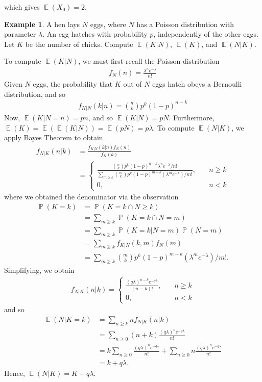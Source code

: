 \documentclass[12pt]{article}
\DeclareMathOperator{\ex}{\mathbb{E}}
\DeclareMathOperator{\prob}{\mathbb{P}}
\theoremstyle{plain}
\theoremstyle{definition}
\newtheorem*{example}{Example}
\theoremstyle{remark}
\numberwithin{equation}{section}  %
\begin{document}
which gives $\ex(X_0) = 2$.
\begin{example}
	A hen lays $N$ eggs, where $N$ has a Poisson distribution with parameter
	$\lambda$. An egg hatches with probability $p$, independently  of the other
	eggs. Let $K$ be the number of chicks. Compute $\ex(K|N)$, $\ex(K)$, and $\ex(N | 
	K)$.
\end{example}
To compute $\ex(K|N)$, we must first recall the Poisson distribution
\begin{align*}
	f_N(n) = \frac{\lambda^n e^{-\lambda}}{n!}
\end{align*}
Given $N$ eggs, the probability that $K$ out of $N$ eggs hatch obeys a 
Bernoulli distribution, and so 
\begin{align*}
	f_{K|N}(k|n) = \binom{n}{k} p^k {(1-p)}^{n-k}
\end{align*}
Now, $\ex(K | N = n) = pn$, and so $\ex(K | N) = pN$. Furthermore, $\ex(K) = \ex(\ex(K
| N	)) = \ex(pN) = p \lambda$.
To compute $\ex(N | K)$, we apply Bayes Theorem to obtain
\begin{align*}
	f_{N|K}(n|k) & = \frac{f_{K|N}(k|n)f_N(n)}{f_K(k)}
	\\
	& = \begin{cases}
	\frac{\binom{n}{k}p^k {(1-p)}^{n-k} \lambda^n
	e^{-\lambda}/n!}{\sum_{m \ge k}
	\binom{m}{k} p^k {(1 - p)}^{m-k} (\lambda^m e^{-\lambda})/m!}
	, \quad & n \ge k
	\\
	0, \quad & n<k
\end{cases}
\end{align*}
where we obtained the denominator via the observation
\begin{align*}
	\prob(K = k) & = \prob(K = k \cap N \ge k) 
	\\
	& = \sum_{m \ge k} \prob(K =
	k \cap N = m) 
	\\
	& = \sum_{m \ge k} \prob(K = k | N = m) \prob(N = m)
	\\
	& = \sum_{m \ge k} f_{K|N}(k, m) f_N(m)
	\\
	& = \sum_{m \ge k}
	\binom{m}{k} p^k {(1 - p)}^{m-k} (\lambda^m e^{-\lambda})/m!.
\end{align*}
Simplifying, we obtain
\begin{align*}
	f_{N|K}(n|k) = 
	\begin{cases}
		\frac{{(q\lambda)}^{n-k} e^{-q\lambda}}{(n-k)!}, \quad & n \ge k
		\\
		0, \quad & n<k
	\end{cases}
\end{align*}
and so 
\begin{align*}
	\ex(N | K = k) & = \sum_{n \ge k} n f_{N|K}(n | k)
	\\
	& = \sum_{n \ge 0} (n + k) \frac{{(q \lambda)}^n e^{-q\lambda}}{n!}
	\\
	& = k \sum_{n \ge 0} \frac{{(q \lambda)}^n e^{-q\lambda}}{n!} + \sum_{n \ge 
0}
n \frac{{(q\lambda)}^n e^{-q\lambda}}{n!} 
\\
& = k + q\lambda.
\end{align*}
Hence, $\ex(N|K) = K + q \lambda$.
\end{document}
